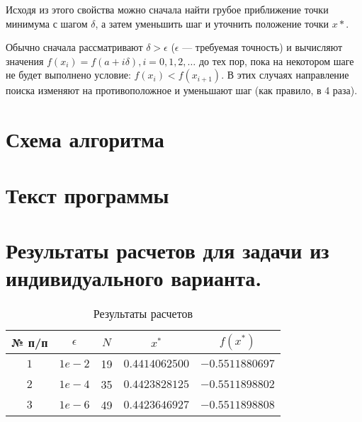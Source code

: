 Исходя из этого свойства можно сначала найти грубое приближение точки минимума с шагом $\delta$, а затем уменьшить шаг и уточнить положение точки $x*$.

Обычно сначала рассматривают $\delta > \epsilon$ ($\epsilon$ --- требуемая точность) и вычисляют значения $f(x_i) = f(a + i\delta), i = 0,1,2,\dots$ до тех пор, пока на некотором шаге не будет выполнено условие: $f(x_i) < f(x_{i+1})$. В этих
случаях направление поиска изменяют на противоположное и уменьшают шаг (как
правило, в 4 раза).

\section{Схема алгоритма}


\section{Текст программы}


\section{Результаты расчетов для задачи из индивидуального варианта.}

\begin{table}[h]
    \centering
    \small
    \caption{Результаты расчетов }
    \label{tbl:cmp}

    \begin{tabular}{|c|c|c|c|c|}
        \hline
        № п/п & $\epsilon$ & $N$ & $x^*$ & $f(x^*)$ \\\hline
        $1$ & $1e-2$ & 19 & $0.4414062500$ & $-0.5511880697$ \\\hline
        $2$ & $1e-4$ & 35 & $0.4423828125$ & $-0.5511898802$ \\\hline
        $3$ & $1e-6$ & 49 & $0.4423646927$ & $-0.5511898808$ \\\hline
    \end{tabular}
\end{table}